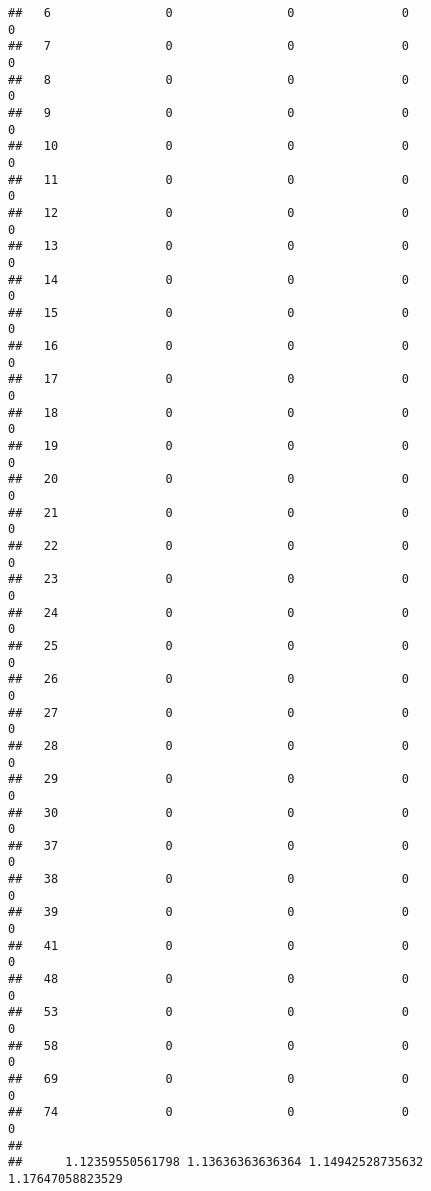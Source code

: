 \documentclass[]{article}
\begin{document}
\begin{verbatim}
##   6                0                0               0                0
##   7                0                0               0                0
##   8                0                0               0                0
##   9                0                0               0                0
##   10               0                0               0                0
##   11               0                0               0                0
##   12               0                0               0                0
##   13               0                0               0                0
##   14               0                0               0                0
##   15               0                0               0                0
##   16               0                0               0                0
##   17               0                0               0                0
##   18               0                0               0                0
##   19               0                0               0                0
##   20               0                0               0                0
##   21               0                0               0                0
##   22               0                0               0                0
##   23               0                0               0                0
##   24               0                0               0                0
##   25               0                0               0                0
##   26               0                0               0                0
##   27               0                0               0                0
##   28               0                0               0                0
##   29               0                0               0                0
##   30               0                0               0                0
##   37               0                0               0                0
##   38               0                0               0                0
##   39               0                0               0                0
##   41               0                0               0                0
##   48               0                0               0                0
##   53               0                0               0                0
##   58               0                0               0                0
##   69               0                0               0                0
##   74               0                0               0                0
##     
##      1.12359550561798 1.13636363636364 1.14942528735632 1.17647058823529

\end{verbatim}
\end{document}
